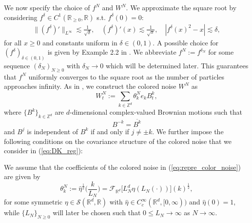 We now specify the choice of $f^N$ and $W^N$. We approximate the square root by considering $f^{\delta} \in C^1(\mathbb{R}_{\geq 0}, \mathbb{R})$ s.t. $f^{\delta}(0) = 0$:  
\begin{equation}\label{eq:approx_square_root}
\begin{split}
    \|(f^{\delta})'\|_{L^{\infty}}\lesssim \frac{1}{\sqrt{\delta}}, \quad(f^{\delta})'(x) \lesssim \frac{1}{\sqrt{x}},\quad |f^{\delta}(x)^2 - x| \lesssim \delta,
\end{split}
\end{equation}
for all $ x \geq 0$ and constants uniform in $\delta \in (0,1)$. A possible choice for $(f^{\delta})_{\delta\in(0,1)}$ is given by Example 2.2 in \cite{DKP23}. We abbreviate $f^{N} := f^{\delta_N}$ for some sequence $(\delta_N)_{N \geq 0}$ with $\delta_N \to 0$ which will be determined later. This guarantees that $f^N$ uniformly converges to the square root as the number of particles approaches infinity. As in \cite{FG21,DKP23}, we construct the colored noise $W^N$ as
\begin{equation}\label{eq:repre_color_noise}
W^N_t := \sum_{k \in \mathbb{Z}^d}\theta^N_ke_kB^k_t,
\end{equation}
where $\{B^k\}_{k \in \mathbb{Z}^d}$ are $d$-dimensional complex-valued Brownian motions such that
\[
B^{-k} = \overline{B^k}
\]
and $B^j$ is independent of $B^k$ if and only if $j \neq \pm k$. We further impose the following conditions on the covariance structure of the colored noise that we consider in (\ref{eq:DK_reg}):
\begin{assu}\label{assu:cov}We assume that the coefficients of the colored noise in (\ref{eq:repre_color_noise}) are given by
\begin{equation}\label{eq:def_theta_k^N}
\theta_k^N := \hat{\eta}^{\frac{1}{2}}\Big(\frac{k}{L_N}\Big) = \mathscr{F}_{\mathbb{R}^d}\big[L_N^d\eta(L_N(\cdot))\big](k)^{\frac{1}{2}},
\end{equation}
for some symmetric $\eta \in \mathscr{S}(\mathbb{R}^d,\mathbb{R})$ with $\hat{\eta} \in C_c^{\infty}(\mathbb{R}^d,[0,\infty))$ and $\hat{\eta}(0) = 1$,
while $\{L_N\}_{N \geq 0}$ will later be chosen such that $0 \leq L_N \to \infty$ as $N \to \infty$.
\end{assu}

